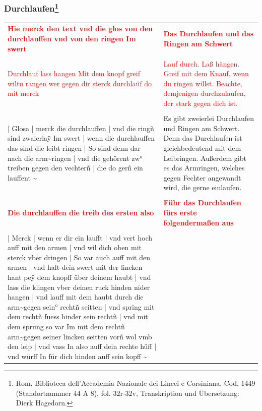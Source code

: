 \newpage

\begin{center}
\end{center}

\newpage

\subsubsection[Durchlaufen]{Durchlaufen\footnote{\hspace*{0.5ex}Rom, Biblioteca dell'Accademia Nazionale dei Lincei e Corsiniana, Cod. 1449 (Standortnummer 44 A 8), fol. 32r-32v, Transkription und Übersetzung: Dierk Hagedorn.}}

\begin{longtable}{p{6.25cm}p{6.25cm}}
\textbf{\textcolor{red}{Hie merck den text vnd die glos von den durchlauffen vnd von den ringen Im swert}}
&
\textbf{\textcolor{red}{Das Durchlaufen und das Ringen am Schwert}}
\\
\\
\textcolor{red}{Durchlauf lass hangen Mit dem knopf greif wiltu rangen wer gegen dir sterck durchlaüf do mit merck}
&
\textcolor{red}{Lauf durch. Laß hängen. Greif mit dem Knauf, wenn du ringen willst. Beachte, demjenigen durchzulaufen, der stark gegen dich ist.}
\\
\\
| Glosa | merck  die durchlauffen | vnd die ringñ sind zwaierlaÿ Im swert | wenn die durchlauffen das sind die leibt ringen | So sind denn dar nach die arm\textasciitilde  ringen | vnd die gehörent zw° treiben gegen den vechterñ | die do gerñ ein lauffent \textasciitilde 
&
Es gibt zweierlei Durchlaufen und Ringen am Schwert. Denn das Durchlaufen ist gleichbedeutend mit dem Leibringen. Außerdem gibt es das Armringen, welches gegen Fechter angewandt wird, die gerne einlaufen.
\\
\\
\textbf{\textcolor{red}{Die durchlauffen die treib des ersten also}}
&
\textbf{\textcolor{red}{Führ das Durchlaufen fürs erste folgendermaßen aus}}
\\
\\
| Merck | wenn er dir ein laufft | vnd vert hoch auff mit den armen | vnd wil dich oben mit sterck vber dringen | So var auch auff mit den armen | vnd halt dein swert mit der lincken hant peÿ dem knopff über deinem haubt | vnd lass die klingen vber deinen ruck hinden nider hangen | vnd lauff mit dem haubt durch die arm\textasciitilde  gegen sein° rechtñ seitten | vnd spring mit dem rechtñ fuess hinder sein rechtñ | vnd mit dem sprung so var Im mit dem rechtñ arm\textasciitilde  gegen seiner lincken seitten vorñ wol vmb den leip | vnd vass In also auff dein rechte hüff | vnd würff In für dich hinden auff sein kopff \textasciitilde 

\end{longtable}

